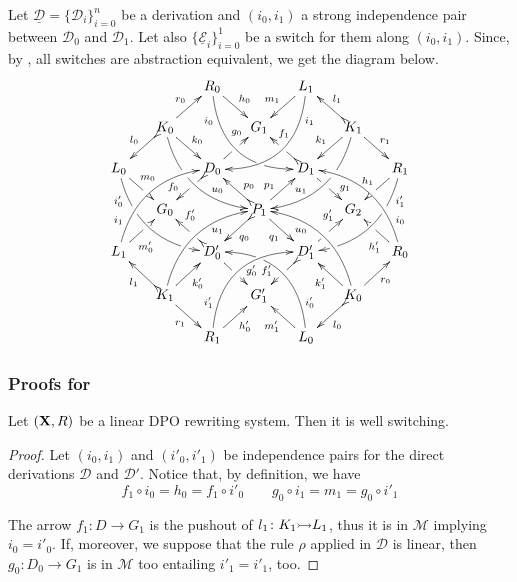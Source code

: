 \documentclass[a4paper,UKenglish,cleveref,pdftex,thm-restate,numberwithinsect,anonymous]{lipics}
\newcommand{\mto}[0]{\scalebox{1}{$\rightarrowtail$}}
\def\R{\mathsf{R}}
\def\X{\textbf {\textup{X}}}
\newcommand{\dder}[1]{\mathscr{#1}}
\newcommand{\der}[1]{\underline{\dder{#1}}}
\begin{document}
\begin{remark}\label{rem:fill} Let $\der{D}=\{\dder{D}_i\}_{i=0}^n$ be a derivation and $(i_0, i_1)$ a strong independence pair between $\dder{D}_0$ and $\dder{D}_1$. Let also $\{\der{E}_{i}\}_{i=0}^1$ be a switch for them along $(i_0, i_1)$. Since, by , all switches are abstraction equivalent, we get the diagram below. 
	\[\xymatrix@C=15pt@R=15pt{&&R_0 \ar@/_.8cm/[ddrr]_(.2){i_0}|(.7)\hole
		\ar[dr]^{h_0}&& L_1\ar@/^.8cm/[ddll]^(.2){i_1}
		\ar[dl]_{m_1}\\&K_0\ar[dr]^{k_0}\ar@{>->}[dl]_{l_0}
		\ar@/_.6cm/[ddrr]|(.36)\hole^(.65){u_0}\ar[ur]^{r_0}&& G_1 &&
		K_1
		\ar@/^.6cm/[ddll]|(.36)\hole_(.65){u_1}\ar[dl]_{k_1}\ar@{>->}[lu]_{l_1}
		\ar[dr]^{r_1}\\L_0
		\ar@/_.6cm/[ddrr]_(.2){i'_0}|(.31)\hole|(.81)\hole
		\ar[dr]^(.4){m_0}|(.61)\hole && D_0
		\ar@{>->}[dl]|(.4)\hole_(.65){f_0}\ar[ur]|(.5)\hole^(.7){g_0}&&D_1
		\ar[dr]|(.4)\hole^(.65){g_1}
		\ar@{>->}[ul]|(.5)\hole_(.65){f_1}&&R_1\ar@/^.6cm/[ddll]^(.2){i'_1}|(.31)\hole|(.81)\hole\ar[dl]_{h_1}|(.6)\hole\\&G_0
		&&P_1\ar[dr]_{q_1}	\ar@{>->}[dl]^{q_0}\ar[ur]^(.4){p_1}\ar@{>->}[ul]_(.4){p_0}&&G_2\\L_1	\ar@/^.6cm/[uurr]^(.2){i_1} \ar[ur]_(.35){m'_0}|(.61)\hole && D'_0	\ar@{>->}[ul]|(.4)\hole_(.65){f'_0}\ar[dr]|(.5)\hole^(.65){g'_0}	&&D'_1\ar[ur]|(.4)\hole^(.65){g'_1} \ar@{>->}[dl]|(.5)\hole_(.65){f'_1}	&& R_0 \ar[ul]^(.35){h'_1}|(.61)\hole\ar@/_.6cm/[uull]_(.2){i_0}\\ &K_1	\ar[ur]_{k'_0} \ar[dr]_{r_1}	\ar@{>->}[ul]^{l_1}\ar@/^.6cm/[uurr]_(.65){u_1}&&G'_1&& K_0\ar[ur]_{r_0} \ar[ul]^{k'_1} \ar@{>->}[dl]^{l_0} \ar@/_.6cm/[uull]^(.65){u_0}\\&& R_1	\ar[ur]_{h'_0}\ar@/^.8cm/[uurr]^(.2){i'_1}&& L_0 \ar[ul]^{m'_1} \ar@/_.8cm/[uull]_(.2){i'_0} |(.69)\hole }\] 

\end{remark}


\subsubsection{Proofs for }

\begin{proposition}
	\label{pr:weak}
	Let $(\X, \R)$ be a linear DPO rewriting system. Then it is well switching.
\end{proposition}
\begin{proof}
	
	Let $(i_0, i_1)$ and $(i'_0, i'_1)$ be independence pairs for the
	direct derivations $\dder{D}$ and $\dder{D}'$. Notice that, by
	definition, we have
	\[
	f_1\circ i_0=h_0=f_1\circ i'_0 \qquad g_0\circ i_1=m_1= g_0\circ i'_1
	\]
	
	The arrow $f_1\colon D\to G_1$ is the pushout of
	$l_1\colon K_1\mto L_1$, thus it is in $\mathcal{M}$ implying
	$i_0=i'_0$. If, moreover, we suppose that the rule $\rho$ applied in
	$\dder{D}$ is linear, then $g_0\colon D_0\to G_1$ is in
	$\mathcal{M}$ too entailing $i'_1=i'_1$, too.
\end{proof}
\end{document}
